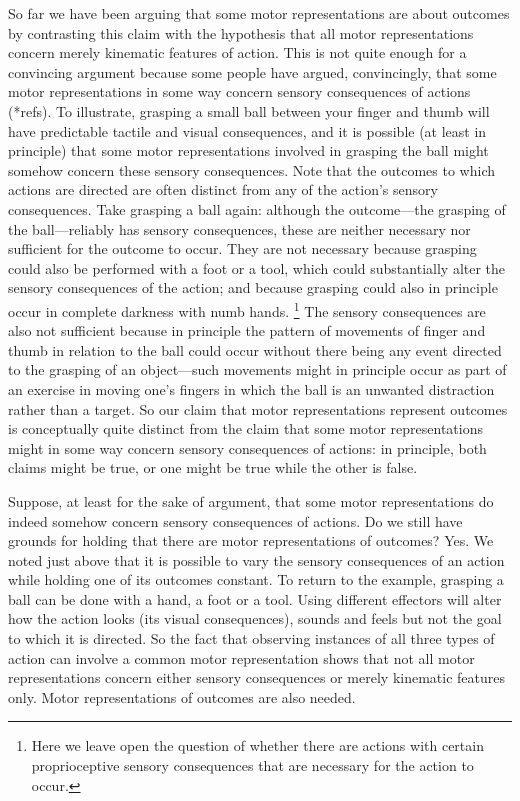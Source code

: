 \documentclass[12pt,\papersize]{extarticle}
\begin{document}
So far we have been arguing that some motor representations are about outcomes by contrasting this claim with the hypothesis that all motor representations concern merely kinematic features of action.  This is not quite enough for a convincing argument because some people have argued, convincingly, that some motor representations in some way concern sensory consequences of actions (*refs).
To illustrate, grasping a small ball between your finger and thumb will have predictable tactile and visual consequences, and it is possible (at least in principle) that some motor representations involved in grasping the ball might somehow concern these sensory consequences.
Note that the outcomes to which actions are directed are often distinct from any of the action's sensory consequences.
Take grasping a ball again: although the outcome---the grasping of the ball---reliably has sensory consequences, these are neither necessary nor sufficient for the outcome to occur.  
They are not necessary because grasping could also be performed with a foot or a tool, which could substantially alter the sensory consequences of the action; and because grasping could also in principle occur in complete darkness with numb hands.%
\footnote{
Here we leave open the question of whether there are actions with certain  proprioceptive sensory consequences that are necessary for the action to occur. 
} 
The sensory consequences are also not sufficient because in principle the pattern of movements of finger and thumb in relation to the ball could occur without there being any event directed to the grasping of an object---such movements might in principle occur as part of an exercise in moving one's fingers in which the ball is an unwanted distraction rather than a target.
So our claim that motor representations represent outcomes is conceptually quite distinct from the claim that some motor representations might in some way concern sensory consequences of actions: in principle, both claims might be true, or one might be true while the other is false.

Suppose, at least for the sake of argument, that some motor representations do indeed somehow concern sensory consequences of actions. 
Do we still have grounds for holding that there are motor representations of outcomes?  Yes.  We noted just above that it is possible to vary the sensory consequences of an action while holding one of its outcomes constant.  
To return to the example, grasping a ball can be done with a hand, a foot or a tool.
Using different effectors will alter how the action looks (its visual consequences), sounds and feels but not the goal to which it is directed. 
So the fact that observing instances of all three types of action can involve a common motor representation shows that not all motor representations concern either sensory consequences or merely kinematic features only.  
Motor representations of outcomes are also needed.
\end{document}
